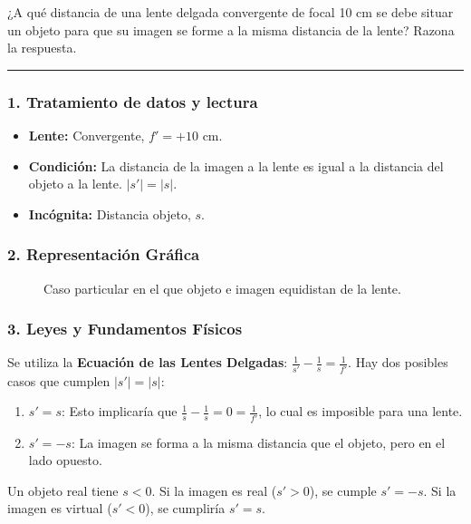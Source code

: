 \begin{cajaenunciado}
¿A qué distancia de una lente delgada convergente de focal 10 cm se debe situar un objeto para que su imagen se forme a la misma distancia de la lente? Razona la respuesta.
\end{cajaenunciado}
\hrule

\subsubsection*{1. Tratamiento de datos y lectura}
\begin{itemize}
    \item \textbf{Lente:} Convergente, $f' = +10$ cm.
    \item \textbf{Condición:} La distancia de la imagen a la lente es igual a la distancia del objeto a la lente. $|s'| = |s|$.
    \item \textbf{Incógnita:} Distancia objeto, $s$.
\end{itemize}

\subsubsection*{2. Representación Gráfica}
\begin{figure}[H]
    \centering
    \caption{Caso particular en el que objeto e imagen equidistan de la lente.}
\end{figure}

\subsubsection*{3. Leyes y Fundamentos Físicos}
Se utiliza la \textbf{Ecuación de las Lentes Delgadas}: $\frac{1}{s'} - \frac{1}{s} = \frac{1}{f'}$.
Hay dos posibles casos que cumplen $|s'|=|s|$:
\begin{enumerate}
    \item $s' = s$: Esto implicaría que $\frac{1}{s} - \frac{1}{s} = 0 = \frac{1}{f'}$, lo cual es imposible para una lente.
    \item $s' = -s$: La imagen se forma a la misma distancia que el objeto, pero en el lado opuesto.
\end{enumerate}
Un objeto real tiene $s<0$. Si la imagen es real ($s'>0$), se cumple $s' = -s$. Si la imagen es virtual ($s'<0$), se cumpliría $s'=s$.

